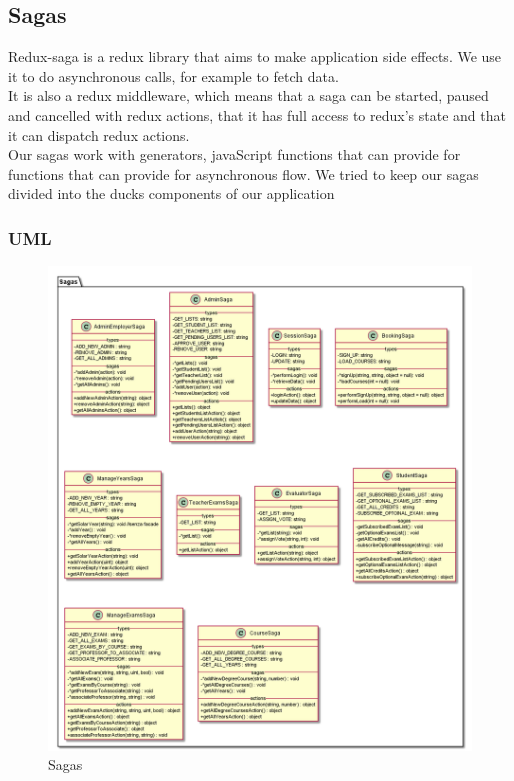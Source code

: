 
	\subsection{Sagas}
	Redux-saga is a redux library that aims to make application side effects. We use it to do asynchronous calls, for example to fetch data.\\
	It is also a redux middleware, which means that a saga can be started, paused and cancelled with redux actions, that it has full access to redux's state and that it can dispatch redux actions.\\
	Our sagas work with generators, javaScript functions that can provide for functions that can provide for asynchronous flow. We tried to keep our sagas divided into the ducks components of our application
	\subsubsection{UML}
	\begin{figure}[H]
		\centering
		\includegraphics[width=1\linewidth]{"../diagrammi/redux/sagas"}
		\caption{Sagas}
		\label{fig:Sagas}
	\end{figure}
